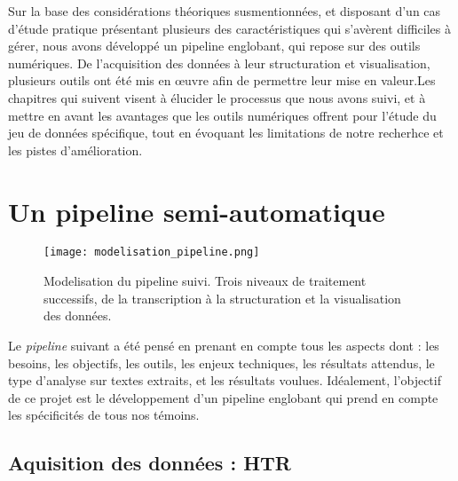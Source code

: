 \documentclass[a4paper, twoside, 12pt]{book}
\begin{document}
Sur la base des considérations théoriques susmentionnées, et disposant d'un cas d'étude pratique présentant plusieurs des caractéristiques qui s'avèrent difficiles à gérer, nous avons développé un pipeline englobant, qui repose sur des outils numériques. De l'acquisition des données à leur structuration et visualisation, plusieurs outils ont été mis en œuvre afin de permettre leur mise en valeur.Les chapitres qui suivent visent à élucider le processus que nous avons suivi, et à mettre en avant les avantages que les outils numériques offrent pour l'étude du jeu de données spécifique, tout en évoquant les limitations de notre recherhce et les pistes d'amélioration.

\chapter{Un pipeline semi-automatique}

\begin{figure}[H]
    \centering
    \texttt{[image: modelisation\_pipeline.png]}
    \caption{Modelisation du pipeline suivi. Trois niveaux de traitement successifs, de la transcription à la structuration et la visualisation des données.}
\end{figure}

Le \textit{pipeline} suivant a été pensé en prenant en compte tous les aspects dont : les besoins, les objectifs, les outils, les enjeux techniques, les résultats attendus, le type d’analyse sur textes extraits, et les résultats voulues. Idéalement, l'objectif de ce projet est le développement d'un pipeline englobant qui prend en compte les spécificités de tous nos témoins.

\section{Aquisition des données : HTR}
\end{document}
